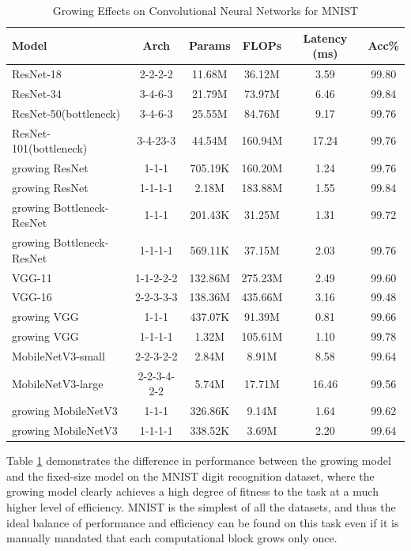 \documentclass[preprint,12pt]{elsarticle}
\begin{document}
\begin{table}[ht]
\centering
\tiny
\renewcommand{\arraystretch}{1.3}
\begin{adjustbox}{center}
\begin{tabular}{lccccc}
\hline
\textbf{Model} & \textbf{Arch} & \textbf{Params} & \textbf{FLOPs} & \textbf{Latency (ms)} & \textbf{Acc\%} \\
\hline
ResNet-18 & 2-2-2-2 & 11.68M & 36.12M & 3.59 & 99.80 \\
ResNet-34 & 3-4-6-3 & 21.79M & 73.97M & 6.46 & 99.84 \\
ResNet-50(bottleneck) & 3-4-6-3 & 25.55M & 84.76M & 9.17 & 99.76 \\
ResNet-101(bottleneck) & 3-4-23-3 & 44.54M & 160.94M & 17.24 & 99.76 \\
growing ResNet & 1-1-1 & 705.19K & 160.20M & 1.24 & 99.76 \\
growing ResNet & 1-1-1-1 & 2.18M & 183.88M & 1.55 & 99.84 \\
growing Bottleneck-ResNet & 1-1-1 & 201.43K & 31.25M & 1.31 & 99.72 \\
growing Bottleneck-ResNet & 1-1-1-1 & 569.11K & 37.15M & 2.03 & 99.76 \\ \hline
VGG-11 & 1-1-2-2-2 & 132.86M & 275.23M & 2.49 & 99.60 \\
VGG-16 & 2-2-3-3-3 & 138.36M & 435.66M & 3.16 & 99.48 \\
growing VGG & 1-1-1 & 437.07K & 91.39M & 0.81 & 99.66 \\
growing VGG & 1-1-1-1 & 1.32M & 105.61M & 1.10 & 99.78 \\ \hline
MobileNetV3-small & 2-2-3-2-2 & 2.84M & 8.91M & 8.58 & 99.64 \\
MobileNetV3-large & 2-2-3-4-2-2 & 5.74M & 17.71M & 16.46 & 99.56 \\
growing MobileNetV3 & 1-1-1 & 326.86K & 9.14M & 1.64 & 99.62 \\
growing MobileNetV3 & 1-1-1-1 & 338.52K & 3.69M & 2.20 & 99.64 \\
\hline
\end{tabular}
\end{adjustbox}
\caption{Growing Effects on Convolutional Neural Networks for MNIST}
\label{table:mnist_self_growth}
\end{table}

Table \ref{table:mnist_self_growth} demonstrates the difference in performance between the growing model and the fixed-size model on the MNIST digit recognition dataset, where the growing model clearly achieves a high degree of fitness to the task at a much higher level of efficiency. MNIST is the simplest of all the datasets, and thus the ideal balance of performance and efficiency can be found on this task even if it is manually mandated that each computational block grows only once.
\end{document}
